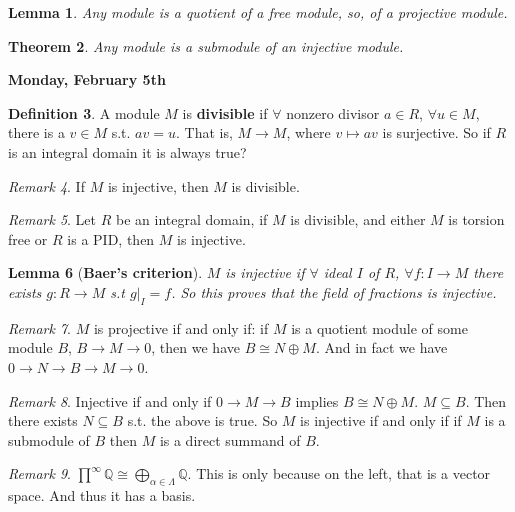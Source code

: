 \documentclass[9pt,reqno,twoside]{amsbook}
\theoremstyle{plain}
\newtheorem{theorem}{Theorem}[chapter]
\numberwithin{section}{chapter}
\numberwithin{equation}{chapter}
\newtheorem{lem}[theorem]{Lemma}
\theoremstyle{definition}
\newtheorem{Def}[theorem]{Definition}
\theoremstyle{remark}
\newtheorem{rem}[theorem]{Remark}
\theoremstyle{plain}
\newcommand{\sub}{\subseteq}
\newcommand{\Q}{\mathbb{Q}}
\begin{document}
\begin{lem}
Any module is a quotient of a free module, so, of a projective module. 
\end{lem}

\begin{theorem}
Any module is a submodule of an injective module. 
\end{theorem}


\textbf{Monday, February 5th}


\begin{Def}
A module $M$ is \textbf{divisible} if $\forall$ nonzero divisor $a \in R$, $\forall u \in M$, there is a $v \in M$ s.t. $av = u$. That is, $M  \to M$, where $v \mapsto av$ is surjective. So if $R$ is an integral domain it is always true?
\end{Def}

\begin{rem}
If $M$ is injective, then $M$ is divisible. 
\end{rem}

\begin{rem}
Let $R$ be an integral domain, if $M$ is divisible, and either $M$ is torsion free or $R$ is a PID, then $M$ is injective. 
\end{rem}

\begin{lem}[\textbf{Baer's criterion}]
$M$ is injective if $\forall$ ideal $I$ of $R$, $\forall f: I \to M$ there exists $g:R \to M$ s.t $g|_I = f$. So this proves that the field of fractions is injective. 
\end{lem}

\begin{rem}
$M$ is projective if and only if: if $M$ is a quotient module of some module $B$, $B \to M \to 0$, then we have $B \cong N \oplus M$. And in fact we have $0 \to N \to B \to M \to 0$. 
\end{rem}

\begin{rem}
Injective if and only if $0 \to M \to B$ implies $B \cong N \oplus M$. $M \sub B$. Then there exists $N \sub B$ s.t. the above is true. So $M$ is injective if and only if if $M$ is a submodule of $B$ then $M$ is a direct summand of $B$. 
\end{rem}

\begin{rem}
$\prod^\infty \Q \cong \bigoplus_{\alpha \in \Lambda}\Q$. This is only because on the left, that is a vector space. And thus it has a basis. 
\end{rem}
\end{document}
